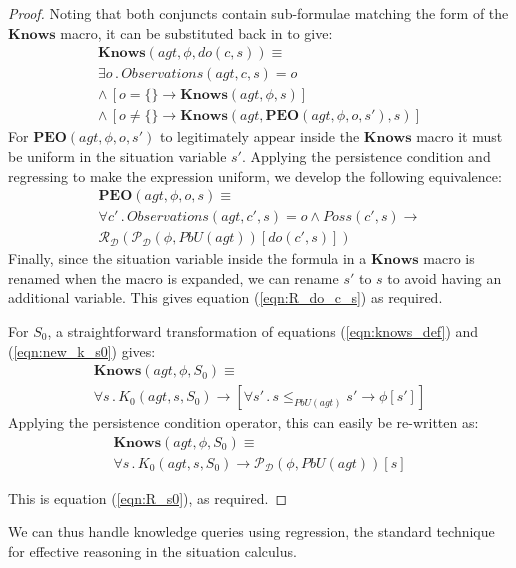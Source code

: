 \documentclass{ifaamas-submission}
\begin{document}
\begin{proof}
Noting that both conjuncts contain sub-formulae matching the form
of the $\mathbf{Knows}$ macro, it can be substituted back in to give:\begin{multline*}
\mathbf{Knows}(agt,\phi,do(c,s))\equiv\\
\exists o\,.\, Observations(agt,c,s)=o\\
\wedge\,\left[o=\{\}\rightarrow\mathbf{Knows}(agt,\phi,s)\right]\\
\wedge\,\left[o\neq\{\}\rightarrow\mathbf{Knows}(agt,\mathbf{PEO}(agt,\phi,o,s'),s)\right]\end{multline*}
 For $\mathbf{PEO}(agt,\phi,o,s')$ to legitimately appear inside
the $\mathbf{Knows}$ macro it must be uniform in the situation variable
$s'$. Applying the persistence condition and regressing to make the
expression uniform, we develop the following equivalence:\begin{multline*}
\mathbf{PEO}(agt,\phi,o,s)\equiv\\
\forall c'\,.\, Observations(agt,c',s)=o\wedge Poss(c',s)\rightarrow\\
\mathcal{R}_{\mathcal{D}}(\mathcal{P}_{\mathcal{D}}(\phi,PbU(agt))[do(c',s)])\end{multline*}
 Finally, since the situation variable inside the formula in a $\mathbf{Knows}$
macro is renamed when the macro is expanded, we can rename $s'$ to
$s$ to avoid having an additional variable. This gives equation (\ref{eqn:R_do_c_s})
as required.

For $S_{0}$, a straightforward transformation of equations (\ref{eqn:knows_def})
and (\ref{eqn:new_k_s0}) gives:\begin{multline*}
\mathbf{Knows}(agt,\phi,S_{0})\equiv\\
\forall s\,.\, K_{0}(agt,s,S_{0})\rightarrow\left[\forall s'\,.\, s\leq_{PbU(agt)}s'\rightarrow\phi[s']\right]\end{multline*}
 Applying the persistence condition operator, this can easily be re-written
as:\begin{multline*}
\mathbf{Knows}(agt,\phi,S_{0})\equiv\\
\forall s\,.\, K_{0}(agt,s,S_{0})\rightarrow\mathcal{P}_{\mathcal{D}}(\phi,PbU(agt))[s]\end{multline*}


This is equation (\ref{eqn:R_s0}), as required.
\end{proof}%
We can thus handle knowledge queries using regression, the standard
technique for effective reasoning in the situation calculus.
\end{document}
